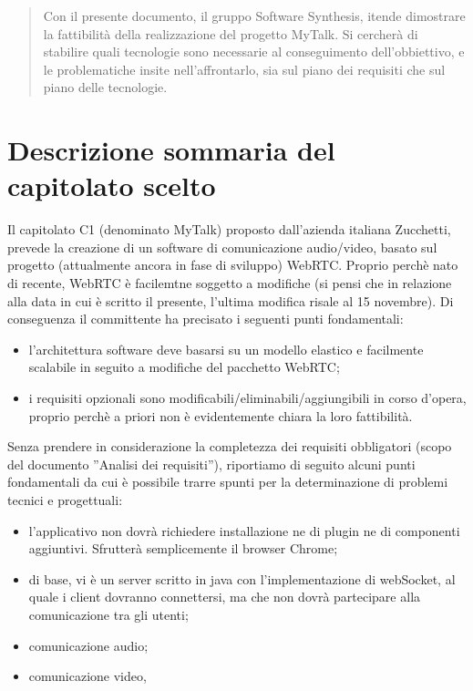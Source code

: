 \begin{abstract}
Con il presente documento, il gruppo Software Synthesis, itende dimostrare la fattibilità della realizzazione del progetto MyTalk. Si cercherà di stabilire quali tecnologie sono necessarie al conseguimento dell'obbiettivo, e le problematiche insite nell'affrontarlo, sia sul piano dei requisiti che sul piano delle tecnologie.
\end{abstract}
\newpage

\section{Descrizione sommaria del capitolato scelto}
Il capitolato C1 (denominato MyTalk) proposto dall'azienda italiana Zucchetti, prevede la creazione di un software di comunicazione audio/video, basato sul progetto (attualmente ancora in fase di sviluppo) WebRTC. Proprio perchè nato di recente, WebRTC è facilemtne soggetto a modifiche (si pensi che in relazione alla data in cui è scritto il presente, l'ultima modifica risale al 15 novembre). Di conseguenza il committente ha precisato i seguenti punti fondamentali:

\begin{itemize}
	\item l'architettura software deve basarsi su un modello elastico e facilmente scalabile in seguito a modifiche del pacchetto WebRTC;
	\item i requisiti opzionali sono modificabili/eliminabili/aggiungibili in corso d'opera, proprio perchè a priori non è evidentemente chiara la loro fattibilità.
\end{itemize}

Senza prendere in considerazione la completezza dei requisiti obbligatori (scopo del documento ''Analisi dei requisiti''), riportiamo di seguito alcuni punti fondamentali da cui è possibile trarre spunti per la determinazione di problemi tecnici e progettuali:

\begin{itemize}
	\item l'applicativo non dovrà richiedere installazione ne di plugin ne di componenti aggiuntivi. Sfrutterà semplicemente il browser Chrome;
	\item di base, vi è un server scritto in java con l'implementazione di webSocket, al quale i client dovranno connettersi, ma che non dovrà partecipare alla comunicazione tra gli utenti;
	\item comunicazione audio;
	\item comunicazione video,
\end{itemize}


